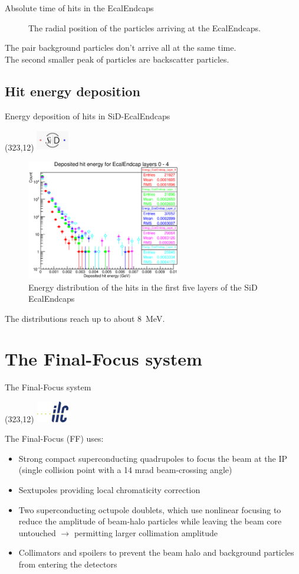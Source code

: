 \documentclass[xcolor={dvipsnames}]{beamer}
\newcommand{\sidlogo}{
  \setlength{\TPHorizModule}{1pt}
  \setlength{\TPVertModule}{1pt}
  \begin{textblock}{1}(323,12)
   \includegraphics[width=40pt,height=26pt]{figures/SiD.jpeg}
  \end{textblock}
  }
\newcommand{\ilclogo}{
  \setlength{\TPHorizModule}{1pt}
  \setlength{\TPVertModule}{1pt}
  \begin{textblock}{1}(323,12)
   \includegraphics[width=40pt,height=26pt]{figures/ILC.jpeg}
  \end{textblock}
}
\begin{document}
\begin{frame}{Absolute time of hits in the EcalEndcaps}
{\begin{figure}
\caption{\small The radial position of the particles arriving at the EcalEndcaps.}
\end{figure}
}
The pair background particles don't arrive all at the same time.\\
The second smaller peak of particles are backscatter particles.
\end{frame} 

\subsection{Hit energy deposition}
\begin{frame}{Energy deposition of hits in SiD-EcalEndcaps}
\sidlogo
 \begin{figure}
 \centering
  \includegraphics[width=0.6\textwidth]{figures/sidloi3_pairs_1312_EcalEndcap_Hits_EcalEndcap_Energy_EcalEndcap_Layer_0-4.eps}
 \caption{Energy distribution of the hits in the first five layers of the SiD EcalEndcaps}
 \end{figure}
The distributions reach up to about \SI{8}{\mega\electronvolt}.
\end{frame}

\section{The Final-Focus system}
\begin{frame}{The Final-Focus system}
 \ilclogo
 The Final-Focus (FF) uses:
\begin{itemize}
 \item Strong compact superconducting quadrupoles to focus the
beam at the IP (single collision point with a 14 mrad beam-crossing angle)
\item Sextupoles providing local chromaticity correction
\item Two superconducting octupole doublets, which use nonlinear
focusing to reduce the amplitude of beam-halo particles while leaving the beam core untouched $\rightarrow$ permitting larger collimation amplitude
\item Collimators and spoilers to prevent the beam halo and background particles from entering the detectors
\end{itemize}

\end{frame}
\end{document}
